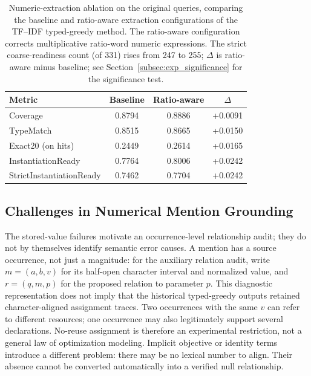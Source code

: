 \documentclass[pdflatex,sn-basic,Numbered]{sn-jnl}
\begin{document}
\begin{table}[t]
  \centering
  \caption{Numeric-extraction ablation on the original queries, comparing the baseline and ratio-aware extraction configurations of the TF--IDF typed-greedy method. The ratio-aware configuration corrects multiplicative ratio-word numeric expressions. The strict coarse-readiness count (of 331) rises from 247 to 255; $\Delta$ is ratio-aware minus baseline; see Section~\ref{subsec:exp_significance} for the significance test.}
  \label{tab:nlp4lp-prefix-postfix}
  \small
  \setlength{\tabcolsep}{4pt}
  \begin{tabular}{lccc}
    \toprule
    Metric & Baseline & Ratio-aware & $\Delta$ \\
    \midrule
Coverage & 0.8794 & 0.8886 & +0.0091 \\
TypeMatch & 0.8515 & 0.8665 & +0.0150 \\
Exact20 (on hits) & 0.2449 & 0.2614 & +0.0165 \\
InstantiationReady & 0.7764 & 0.8006 & +0.0242 \\
StrictInstantiationReady & 0.7462 & 0.7704 & +0.0242 \\
    \bottomrule
  \end{tabular}
\end{table}

\subsection{Challenges in Numerical Mention Grounding}
\label{subsec:numerical-grounding-challenges}

The stored-value failures motivate an occurrence-level relationship audit; they do not by themselves identify semantic error causes. A mention has a source occurrence, not just a magnitude: for the auxiliary relation audit, write $m=(a,b,v)$ for its half-open character interval and normalized value, and $r=(q,m,p)$ for the proposed relation to parameter $p$. This diagnostic representation does not imply that the historical typed-greedy outputs retained character-aligned assignment traces. Two occurrences with the same $v$ can refer to different resources; one occurrence may also legitimately support several declarations. No-reuse assignment is therefore an experimental restriction, not a general law of optimization modeling. Implicit objective or identity terms introduce a different problem: there may be no lexical number to align. Their absence cannot be converted automatically into a verified null relationship.
\end{document}
